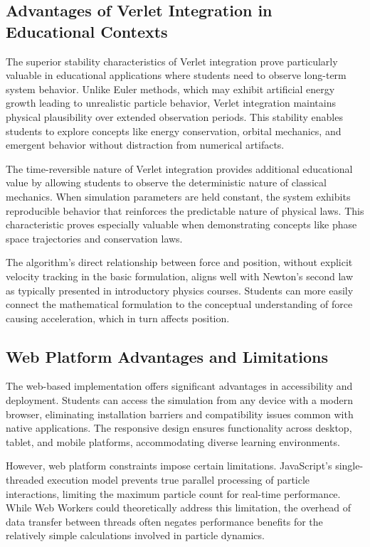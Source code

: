 \documentclass[12pt,journal,onecolumn]{IEEEtran}
\begin{document}
\subsection{Advantages of Verlet Integration in Educational Contexts}
The superior stability characteristics of Verlet integration prove particularly valuable in educational applications where students need to observe long-term system behavior. Unlike Euler methods, which may exhibit artificial energy growth leading to unrealistic particle behavior, Verlet integration maintains physical plausibility over extended observation periods. This stability enables students to explore concepts like energy conservation, orbital mechanics, and emergent behavior without distraction from numerical artifacts.

The time-reversible nature of Verlet integration provides additional educational value by allowing students to observe the deterministic nature of classical mechanics. When simulation parameters are held constant, the system exhibits reproducible behavior that reinforces the predictable nature of physical laws. This characteristic proves especially valuable when demonstrating concepts like phase space trajectories and conservation laws.

The algorithm's direct relationship between force and position, without explicit velocity tracking in the basic formulation, aligns well with Newton's second law as typically presented in introductory physics courses. Students can more easily connect the mathematical formulation to the conceptual understanding of force causing acceleration, which in turn affects position.

\subsection{Web Platform Advantages and Limitations}
The web-based implementation offers significant advantages in accessibility and deployment. Students can access the simulation from any device with a modern browser, eliminating installation barriers and compatibility issues common with native applications. The responsive design ensures functionality across desktop, tablet, and mobile platforms, accommodating diverse learning environments.

However, web platform constraints impose certain limitations. JavaScript's single-threaded execution model prevents true parallel processing of particle interactions, limiting the maximum particle count for real-time performance. While Web Workers could theoretically address this limitation, the overhead of data transfer between threads often negates performance benefits for the relatively simple calculations involved in particle dynamics.
\end{document}

